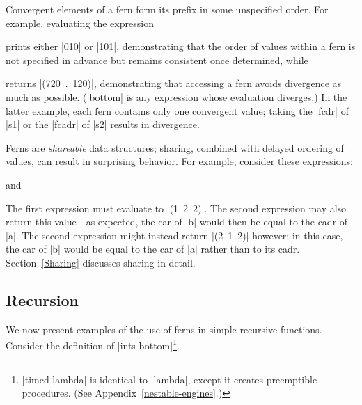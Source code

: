 Convergent elements of a fern form its prefix in some unspecified
order. For example, evaluating the expression

\schemedisplayspace
{}

\noindent 
prints either \schemeresult|010| or \schemeresult|101|,
demonstrating that the order of values within a fern is not specified in
advance but remains consistent once determined, while

\schemedisplayspace
{}

\noindent returns \mbox{\schemeresult|(720 . 120)|}, demonstrating
that accessing a fern avoids divergence as much as possible.
(\scheme|bottom| is any expression whose evaluation diverges.)  In the
latter example, each fern contains only one convergent value; taking
the \scheme|fcdr| of \scheme|s1| or the \scheme|fcadr| of \scheme|s2|
results in divergence.

Ferns are \emph{shareable} data structures; sharing, combined with
delayed ordering of values, can result in surprising behavior.  For
example, consider these expressions:

\schemedisplayspace
{}

\noindent and


\schemedisplayspace
{}

\noindent
The first expression must evaluate to \mbox{\schemeresult|(1 2
  2)|}.  The second expression may also return this value---as
expected, the car of \scheme|b| would then be equal to the cadr of
\scheme|a|.  The second expression might instead return
\mbox{\schemeresult|(2 1 2)|} however; in this case, the car of \scheme|b|
would be equal to the car of \scheme|a| rather than to its cadr.
Section~\ref{Sharing} discusses sharing in detail.

\subsection{Recursion}\label{fernsRecursiveExamples}

We now present examples of the use of ferns in simple recursive
functions. Consider the definition of \scheme|ints-bottom|\footnote{\scheme|timed-lambda| is identical to
  \scheme|lambda|, except it creates preemptible procedures. 
(See Appendix~\ref{nestable-engines}.)}.

\schemedisplayspace
{}

